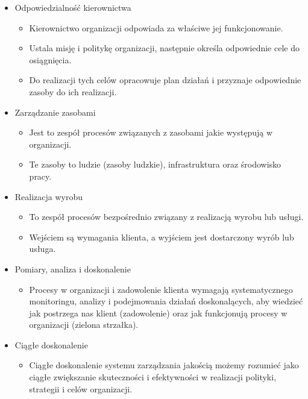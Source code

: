 \documentclass[a4paper]{article}
\begin{document}
\begin{itemize}
    \item Odpowiedzialność kierownictwa
    \begin{itemize}
        \item Kierownictwo organizacji odpowiada za
        właściwe jej funkcjonowanie.
        \item Ustala misję i politykę organizacji,
        następnie określa odpowiednie cele do
        osiągnięcia.
        \item Do realizacji tych celów opracowuje plan
        działań i przyznaje odpowiednie zasoby
        do ich realizacji.
    \end{itemize}
    \item Zarządzanie zasobami
    \begin{itemize}
        \item Jest to zespół procesów
        związanych z zasobami jakie
        występują w organizacji.
        \item Te zasoby to ludzie (zasoby
        ludzkie), infrastruktura oraz
        środowisko pracy.
    \end{itemize}
    \item Realizacja wyrobu
    \begin{itemize}
    \item To zespół procesów bezpośrednio związany z
    realizacją wyrobu lub usługi.
    \item Wejściem są wymagania klienta, a wyjściem jest
    dostarczony wyrób lub usługa.
    \end{itemize}
    \item Pomiary, analiza i doskonalenie
    \begin{itemize}
        \item Procesy w organizacji i zadowolenie klienta
        wymagają systematycznego monitoringu, analizy i
        podejmowania działań doskonalących, aby wiedzieć
        jak postrzega nas klient (zadowolenie) oraz jak
        funkcjonują procesy w organizacji (zielona strzałka).
    \end{itemize}
    \item Ciągłe doskonalenie
    \begin{itemize}
        \item Ciągłe doskonalenie systemu zarządzania jakością
        możemy rozumieć jako ciągłe zwiększanie
        skuteczności i efektywności w realizacji polityki,
        strategii i celów organizacji.
    \end{itemize}
\end{itemize}
\end{document}
